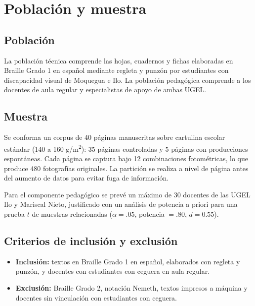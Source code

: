 \section{Población y muestra}

\subsection{Población}
La población técnica comprende las hojas, cuadernos y fichas elaboradas en
Braille Grado 1 en español mediante regleta y punzón por estudiantes con
discapacidad visual de Moquegua e Ilo. La población pedagógica comprende a los
docentes de aula regular y especialistas de apoyo de ambas UGEL.

\subsection{Muestra}
Se conforma un corpus de 40 páginas manuscritas sobre cartulina escolar estándar
(140 a 160 g/m\textsuperscript{2}): 35 páginas controladas y 5 páginas con
producciones espontáneas. Cada página se captura bajo 12 combinaciones
fotométricas, lo que produce 480 fotografías originales. La partición se realiza
a nivel de página antes del aumento de datos para evitar fuga de información.

Para el componente pedagógico se prevé un máximo de 30 docentes de las UGEL Ilo y
Mariscal Nieto, justificado con un análisis de potencia a priori para una prueba
$t$ de muestras relacionadas ($\alpha = .05$, potencia $= .80$, $d = 0.55$).

\subsection{Criterios de inclusión y exclusión}
\begin{itemize}
  \item \textbf{Inclusión:} textos en Braille Grado 1 en español, elaborados con
  regleta y punzón, y docentes con estudiantes con ceguera en aula regular.
  \item \textbf{Exclusión:} Braille Grado 2, notación Nemeth, textos impresos a
  máquina y docentes sin vinculación con estudiantes con ceguera.
\end{itemize}
